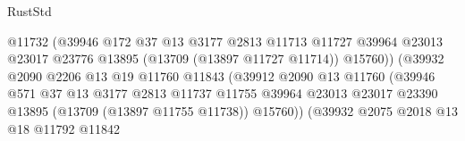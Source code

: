 \begin{lexlean}{RustStd}
\begin{coremodule}
                                            @11732
                                            (@39946
                                              @172
                                              @37
                                              @13
                                              @3177
                                              @2813
                                              @11713
                                              @11727
                                              @39964
                                              @23013
                                              @23017
                                              @23776
                                              @13895
                                              (@13709 (@13897 @11727 @11714))
                                              @15760))
                                          (@39932
                                            @2090
                                            @2206
                                            @13
                                            @19
                                            @11760
                                            @11843
                                            (@39912
                                              @2090
                                              @13
                                              @11760
                                              (@39946
                                                @571
                                                @37
                                                @13
                                                @3177
                                                @2813
                                                @11737
                                                @11755
                                                @39964
                                                @23013
                                                @23017
                                                @23390
                                                @13895
                                                (@13709 (@13897 @11755 @11738))
                                                @15760))
                                            (@39932
                                              @2075
                                              @2018
                                              @13
                                              @18
                                              @11792
                                              @11842

\end{coremodule}
\end{lexlean}
